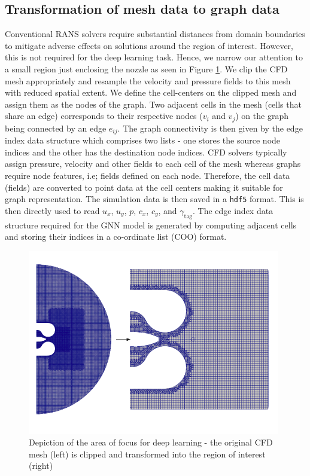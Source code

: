 \subsection{Transformation of mesh data to graph data}
Conventional \gls{RANS} solvers require substantial distances from domain boundaries to mitigate adverse effects on solutions around the region of interest. However, this is not required for the deep learning task. Hence, we narrow our attention to a small region just enclosing the nozzle as seen in Figure \ref{clipmesh}. We clip the CFD mesh appropriately and resample the velocity and pressure fields to this mesh with reduced spatial extent. We define the cell-centers on the clipped mesh and assign them as the nodes of the graph. Two adjacent cells in the mesh (cells that share an edge) corresponds to their respective nodes ($v_i$ and $v_j$) on the graph being connected by an edge $e_{ij}$. The graph connectivity is then given by the edge index data structure which comprises two lists - one stores the source node indices and the other has the destination node indices. CFD solvers typically assign pressure, velocity and other fields to each cell of the mesh whereas graphs require node features, i.e; fields defined on each node. Therefore, the cell data (fields) are converted to point data at the cell centers making it suitable for graph representation. The simulation data is then saved in a \verb|hdf5| format. This is then directly used to read $u_{x}$, $u_{y}$, $p$, $c_x$, $c_y$, and $\gamma_{\operatorname{tag}}$. The edge index data structure required for the GNN model is generated by computing adjacent cells and storing their indices in a co-ordinate list (COO) format. 
\begin{figure}[ht]
    \centering
    \includegraphics[width=11cm]{images/Methodology/Clipped.png}
    \caption{Depiction of the area of focus for deep learning - the original CFD mesh (left) is clipped and transformed into the region of interest (right)}
    \label{clipmesh}
\end{figure}

